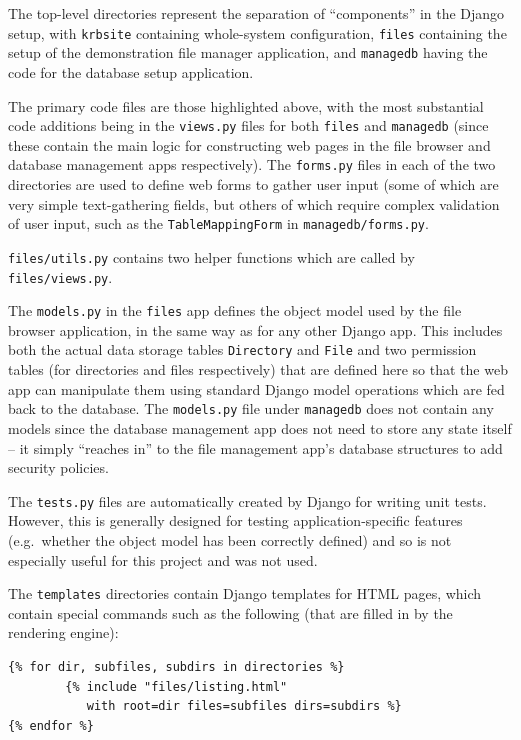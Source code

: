 \documentclass[12pt]{report}
\begin{document}
The top-level directories represent the separation of ``components'' in the Django setup, with \texttt{krbsite} containing whole-system configuration, \texttt{files} containing the setup of the demonstration file manager application, and \texttt{managedb} having the code for the database setup application.

The primary code files are those highlighted above, with the most substantial code additions being in the \texttt{views.py} files for both \texttt{files} and \texttt{managedb} (since these contain the main logic for constructing web pages in the file browser and database management apps respectively). The \texttt{forms.py} files in each of the two directories are used to define web forms to gather user input (some of which are very simple text-gathering fields, but others of which require complex validation of user input, such as the \texttt{TableMappingForm} in \texttt{managedb/forms.py}.

\texttt{files/utils.py} contains two helper functions which are called by \texttt{files/views.py}.

The \texttt{models.py} in the \texttt{files} app defines the object model used by the file browser application, in the same way as for any other Django app. This includes both the actual data storage tables \texttt{Directory} and \texttt{File} and two permission tables (for directories and files respectively) that are defined here so that the web app can manipulate them using standard Django model operations which are fed back to the database. The \texttt{models.py} file under \texttt{managedb} does not contain any models since the database management app does not need to store any state itself -- it simply ``reaches in'' to the file management app's database structures to add security policies.

The \texttt{tests.py} files are automatically created by Django for writing unit tests. However, this is generally designed for testing application-specific features (e.g.\ whether the object model has been correctly defined) and so is not especially useful for this project and was not used.

The \texttt{templates} directories contain Django templates for HTML pages, which contain special commands such as the following (that are filled in by the rendering engine):

\begin{verbatim}
{% for dir, subfiles, subdirs in directories %}
        {% include "files/listing.html"
           with root=dir files=subfiles dirs=subdirs %}
{% endfor %}
\end{verbatim}
\end{document}
